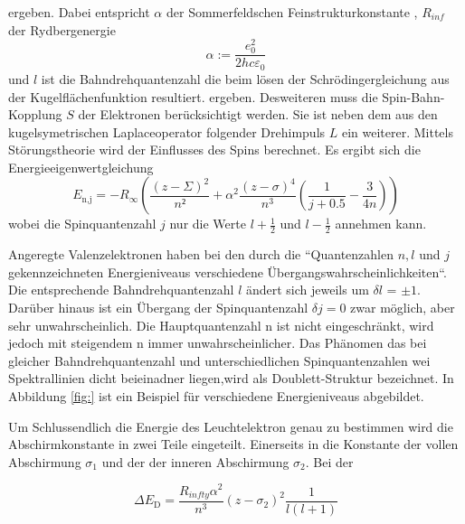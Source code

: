 ergeben. Dabei entspricht $\alpha$ der Sommerfeldschen Feinstrukturkonstante , $R_{inf}$ der Rydbergenergie
\begin{equation}
  \alpha := \frac{e_0^2}{2 h c \varepsilon_0}
  \label{eqn:alpha}
\end{equation}
und $l$ ist die Bahndrehquantenzahl die beim lösen der Schrödingergleichung aus der Kugelflächenfunktion resultiert.  
ergeben. Desweiteren muss die Spin-Bahn-Kopplung $S$ der Elektronen berücksichtigt werden. Sie ist neben dem aus den kugelsymetrischen Laplaceoperator folgender Drehimpuls $L$ ein weiterer. Mittels Störungstheorie wird der Einflusses des Spins berechnet. Es ergibt sich die Energieeigenwertgleichung 
\begin{equation}
  E_\text{n,j} = -R_{\infty}\left( \frac{(z - \Sigma)^2}{n²} + \alpha^2 \frac{(z - \sigma)^4}{n^3} \left( \frac{1}{j + 0.5} - \frac{3}{4n} \right) \right)
  \label{<++>}
\end{equation}
wobei die Spinquantenzahl $j$ nur die Werte $l + \frac{1}{2}$ und $l - \frac{1}{2}$ annehmen kann. 

Angeregte Valenzelektronen haben bei den durch die ``Quantenzahlen $n ,l$ und $j$ gekennzeichneten Energieniveaus verschiedene Übergangswahrscheinlichkeiten``.	Die entsprechende Bahndrehquantenzahl $l$ ändert sich jeweils um $\delta l$ = $\pm 1$. Darüber hinaus ist ein Übergang der Spinquantenzahl $\delta j = 0$ zwar möglich, aber sehr unwahrscheinlich. Die Hauptquantenzahl n ist nicht eingeschränkt, wird jedoch mit steigendem n immer unwahrscheinlicher. Das Phänomen das bei gleicher Bahndrehquantenzahl und unterschiedlichen Spinquantenzahlen wei Spektrallinien dicht beieinadner liegen,wird als Doublett-Struktur bezeichnet. In Abbildung \ref{fig:} ist ein Beispiel für verschiedene Energieniveaus abgebildet.

Um Schlussendlich die Energie des Leuchtelektron genau zu bestimmen wird die Abschirmkonstante in zwei Teile eingeteilt. Einerseits in die Konstante der vollen Abschirmung $\sigma_1$ und der der inneren Abschirmung $\sigma_2$. Bei der

\begin{equation}
  \Delta E_\text{D} = \frac{R_{infty} \alpha^2}{n^3} \left( z - \sigma_2 \right)^2 \frac{1}{l(l+1)}
  \label{<++>}
\end{equation}

